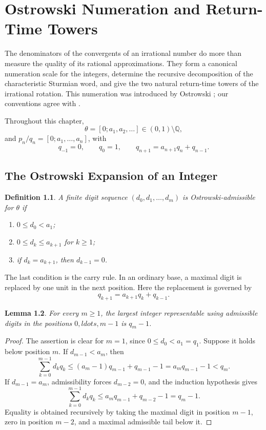 \documentclass{book}
\newtheorem{definition}{Definition}[section]
\newtheorem{lemma}[definition]{Lemma}
\begin{document}
\chapter{Ostrowski Numeration and Return-Time Towers} 

The denominators of the convergents of an irrational number do more than
measure the quality of its rational approximations.  They form a canonical
numeration scale for the integers, determine the recursive decomposition of
the characteristic Sturmian word, and give the two natural return-time
towers of the irrational rotation.  This numeration was introduced by
Ostrowski \cite{Ostrowski1922}; our conventions agree with
\cite[Section~3.9]{Lothaire2002}.

Throughout this chapter,
\[
  \theta=[0;a_1,a_2,\ldots]\in(0,1)\setminus\mathbb Q,
\]
and \(p_n/q_n=[0;a_1,\ldots,a_n]\), with
\[
  q_{-1}=0,\qquad q_0=1,\qquad
  q_{n+1}=a_{n+1}q_n+q_{n-1}.
\]

\section{The Ostrowski Expansion of an Integer}

\begin{definition}\label{definition:OstrowskiAdmissible}
  A finite digit sequence \((d_0,d_1,\ldots,d_m)\) is
  \textnormal{Ostrowski-admissible} for \(\theta\) if
  \begin{enumerate}
    \item \(0\leq d_0<a_1\);
    \item \(0\leq d_k\leq a_{k+1}\) for \(k\geq1\);
    \item if \(d_k=a_{k+1}\), then \(d_{k-1}=0\).
  \end{enumerate}
\end{definition}

The last condition is the carry rule.  In an ordinary base, a maximal digit
is replaced by one unit in the next position.  Here the replacement is
governed by
\[
  q_{k+1}=a_{k+1}q_k+q_{k-1}.
\]

\begin{lemma}\label{lemma:OstrowskiLowerDigitBound}
  For every \(m\geq1\), the largest integer representable using admissible
  digits in the positions \(0,ldots,m-1\) is \(q_m-1\).
\end{lemma}
\begin{proof}
  The assertion is clear for \(m=1\), since
  \(0\leq d_0<a_1=q_1\).  Suppose it holds below position \(m\).
  If \(d_{m-1}<a_m\), then
  \[
    \sum_{k=0}^{m-1}d_kq_k
    \leq(a_m-1)q_{m-1}+q_{m-1}-1
    =a_mq_{m-1}-1<q_m.
  \]
  If \(d_{m-1}=a_m\), admissibility forces \(d_{m-2}=0\), and the induction
  hypothesis gives
  \[
    \sum_{k=0}^{m-1}d_kq_k
    \leq a_mq_{m-1}+q_{m-2}-1=q_m-1.
  \]
  Equality is obtained recursively by taking the maximal digit in position
  \(m-1\), zero in position \(m-2\), and a maximal admissible tail below it.
\end{proof}
\end{document}
